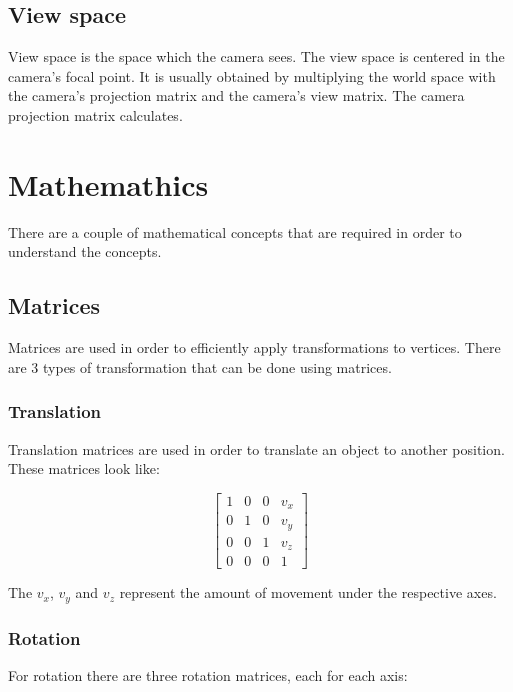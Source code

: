 \subsection{View space}

View space is the space which the camera sees. The view space is centered in the camera’s focal point. It is usually obtained by multiplying the world space with the camera’s projection matrix and the camera’s view matrix. The camera projection matrix calculates.

\section{Mathemathics}

There are a couple of mathematical concepts that are required in order to understand the concepts.

\subsection{Matrices}

Matrices are used in order to efficiently apply transformations to vertices. There are 3 types of transformation that can be done using matrices.

\subsubsection{Translation}

Translation matrices are used in order to translate an object to another position. These matrices look like:

\[ \begin{bmatrix}
	1 & 0 & 0 & v_{x}\\ 
	0 & 1 & 0 & v_{y}\\ 
	0 & 0 & 1 & v_{z}\\ 
	0 & 0 & 0 & 1
\end{bmatrix}
\]

The \(v_{x}\), \(v_{y}\) and \(v_{z}\) represent the amount of movement under the respective axes.

\subsubsection{Rotation}

For rotation there are three rotation matrices, each for each axis:

